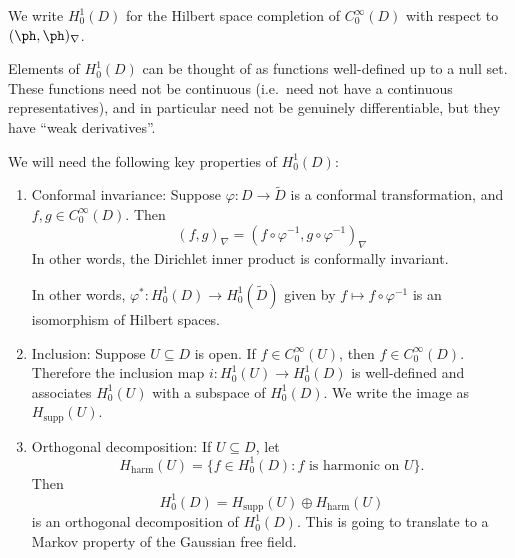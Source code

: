 \documentclass[a4paper]{article}
\begin{document}
\begin{defi}[$H_0^1(D)$]
  We write $H_0^1(D)$ for the Hilbert space completion of $C_0^\infty(D)$ with respect to $(\ph, \ph)_{\nabla}$.
\end{defi}
Elements of $H_0^1(D)$ can be thought of as functions well-defined up to a null set. These functions need not be continuous (i.e.\ need not have a continuous representatives), and in particular need not be genuinely differentiable, but they have ``weak derivatives''.

We will need the following key properties of $H_0^1(D)$:
\begin{prop}\leavevmode
  \begin{enumerate}
    \item Conformal invariance: Suppose $\varphi: D \to \tilde{D}$ is a conformal transformation, and $f, g \in C_0^\infty(D)$. Then
      \[
        (f, g)_\nabla = (f \circ \varphi^{-1}, g \circ \varphi^{-1})_\nabla
      \]
      In other words, the Dirichlet inner product is conformally invariant.

      In other words, $\varphi^*: H_0^1(D) \to H_0^1(\tilde{D})$ given by $f \mapsto f \circ \varphi^{-1}$ is an isomorphism of Hilbert spaces.
    \item Inclusion: Suppose $U \subseteq D$ is open. If $f \in C_0^\infty(U)$, then $f \in C_0^\infty(D)$. Therefore the inclusion map $i: H_0^1(U) \to H_0^1(D)$ is well-defined and associates $H_0^1(U)$ with a subspace of $H_0^1(D)$. We write the image as $H_{\mathrm{supp}}(U)$.
    \item Orthogonal decomposition: If $U \subseteq D$, let
      \[
        H_{\mathrm{harm}}(U) = \{f \in H_0^1(D): f\text{ is harmonic on }U\}.
      \]
      Then
      \[
        H_0^1(D) = H_{\mathrm{supp}}(U) \oplus H_{\mathrm{harm}}(U)
      \]
      is an orthogonal decomposition of $H_0^1(D)$. This is going to translate to a Markov property of the Gaussian free field.
  \end{enumerate}
\end{prop}
\end{document}

